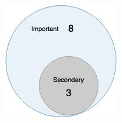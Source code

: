 \begin{figure}[H]
\begin{center}
\includegraphics[scale=0.5]{figures/question1_1}
\label{fig:hybris_architecture/interview/question1-1}
\end{center}
\end{figure}
\\


